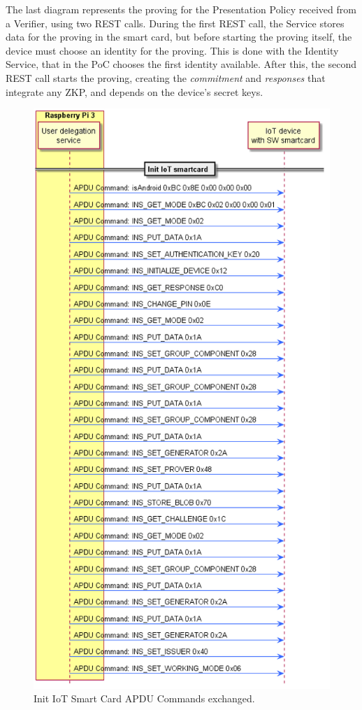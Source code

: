 \documentclass[journal]{IEEEtran}
\begin{document}
The last diagram represents the proving for the Presentation Policy received from a Verifier, using two REST calls. During the first REST call, the Service stores data for the proving in the smart card, but before starting the proving itself, the device must choose an identity for the proving. This is done with the Identity Service, that in the PoC chooses the first identity available. After this, the second REST call starts the proving, creating the \textit{commitment} and \textit{responses} that integrate any ZKP, and depends on the device's secret keys.


\begin{figure}[bth]
	\begin{center}
		\includegraphics[width=0.9\linewidth]{gfx/UML/APDUsInitIoTSC}
	\end{center}
	\caption{Init IoT Smart Card APDU Commands exchanged.}
	\label{fig:APDUsInitIoTSC}
\end{figure}
\end{document}
